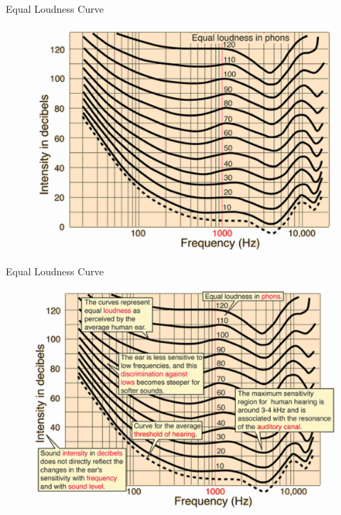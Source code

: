 \documentclass[9pt,mathserif]{beamer}
\begin{document}
\begin{frame}{Equal Loudness Curve}
	\begin{figure}
		\centering
		\includegraphics[height=0.85\textheight]{img/idealfluid/eqlou.jpg}
	\end{figure}
\end{frame}

\begin{frame}{Equal Loudness Curve}
	\begin{figure}
		\centering
		\includegraphics[height=0.85\textheight]{img/idealfluid/eqlou2.jpg}
	\end{figure}
\end{frame}
\end{document}
